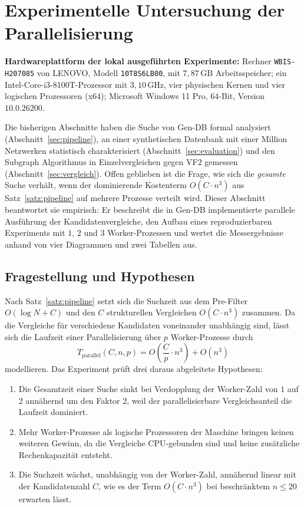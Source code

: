 \documentclass[a4paper,12pt, twoside]{report}
\newcommand{\experimenthardware}{%
	\par\smallskip\noindent
	\textbf{Hardwareplattform der lokal ausgeführten Experimente:} Rechner \texttt{WBIS-H207085} von LENOVO, Modell \texttt{10T8S6LB00}, mit $7{,}87\,\mathrm{GB}$ Arbeitsspeicher; ein Intel-Core-i3-8100T-Prozessor mit $3{,}10\,\mathrm{GHz}$, vier physischen Kernen und vier logischen Prozessoren (x64); Microsoft Windows 11 Pro, 64-Bit, Version $10.0.26200$.
	\par\smallskip}
\theoremstyle{definition}
\begin{document}
\chapter{Experimentelle Untersuchung der Parallelisierung}
\label{sec:parallel}

\experimenthardware

Die bisherigen Abschnitte haben die Suche von Gen-DB formal analysiert (Abschnitt~\ref{sec:pipeline}), an einer synthetischen Datenbank mit einer Million Netzwerken statistisch charakterisiert (Abschnitt~\ref{sec:evaluation}) und den Subgraph Algorithmus in Einzelvergleichen gegen VF2 gemessen (Abschnitt~\ref{sec:vergleich}). Offen geblieben ist die Frage, wie sich die \emph{gesamte} Suche verhält, wenn der dominierende Kostenterm $O(C\cdot n^3)$ aus Satz~\ref{satz:pipeline} auf mehrere Prozesse verteilt wird. Dieser Abschnitt beantwortet sie empirisch: Er beschreibt die in Gen-DB implementierte parallele Ausführung der Kandidatenvergleiche, den Aufbau eines reproduzierbaren Experiments mit $1$, $2$ und $3$ Worker-Prozessen und wertet die Messergebnisse anhand von vier Diagrammen und zwei Tabellen aus.

\section{Fragestellung und Hypothesen}
\label{sec:parallel_hyp}

Nach Satz~\ref{satz:pipeline} setzt sich die Suchzeit aus dem Pre-Filter $O(\log N + C)$ und den $C$ strukturellen Vergleichen $O(C\cdot n^3)$ zusammen. Da die Vergleiche für verschiedene Kandidaten voneinander unabhängig sind, lässt sich die Laufzeit einer Parallelisierung über $p$ Worker-Prozesse durch
\[
T_{\text{parallel}}(C,n,p) = O\!\left(\frac{C}{p}\cdot n^3\right) + O(n^3)
\]
modellieren. Das Experiment prüft drei daraus abgeleitete Hypothesen:

\begin{enumerate}
	\item[\textbf{H1}] Die Gesamtzeit einer Suche sinkt bei Verdopplung der Worker-Zahl von $1$ auf $2$ annähernd um den Faktor $2$, weil der parallelisierbare Vergleichsanteil die Laufzeit dominiert.
	\item[\textbf{H2}] Mehr Worker-Prozesse als logische Prozessoren der Maschine bringen keinen weiteren Gewinn, da die Vergleiche CPU-gebunden sind und keine zusätzliche Rechenkapazität entsteht.
	\item[\textbf{H3}] Die Suchzeit wächst, unabhängig von der Worker-Zahl, annähernd linear mit der Kandidatenzahl $C$, wie es der Term $O(C\cdot n^3)$ bei beschränktem $n\le 20$ erwarten lässt.
\end{enumerate}
\end{document}
